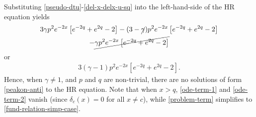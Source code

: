 \documentclass[12pt,reqno]{amsart}
\numberwithin{equation}{section}  %
\numberwithin{figure}{section}
\theoremstyle{plain}  %
\theoremstyle{definition}
\begin{document}
%
%
Substituting \eqref{pseudo-dtu}-\eqref{del-x-delx-u-sq} into the left-hand-side
of the HR equation yields
%
%
\begin{gather*}
  3 \gamma p^{2}e^{-2x}\left[ e^{-2q} + e^{2q} -2 \right]
  - (3 -\cancel{\gamma})p^{2}e^{-2x}\left[ e^{-2q} + e^{2q}-2 \right]
  \\
  - \cancel{\gamma
  p^{2}e^{-2x}\left[ e^{-2q} + e^{2q}-2 \right]}
\end{gather*}
%
%
or
%
%
\begin{equation}
  \label{fund-relation-simp-case}
  \begin{split}
    3(\gamma -1)p^{2}e^{-2x}\left[ e^{-2q} + e^{2q}-2 \right].
  \end{split}
\end{equation}
%
%
Hence, when $\gamma \neq 1$, and $p$ and $q$ are non-trivial, there are no solutions of form \eqref{peakon-anti}
to the HR equation. Note that when $x > q$, \eqref{ode-term-1} and
\eqref{ode-term-2} vanish (since $\delta_{c}(x) = 0$ for all $x \neq c$), while \eqref{problem-term}
simplifies to \eqref{fund-relation-simp-case}.
%
%
%
%
%
%
%
%
%
%
\end{document}
